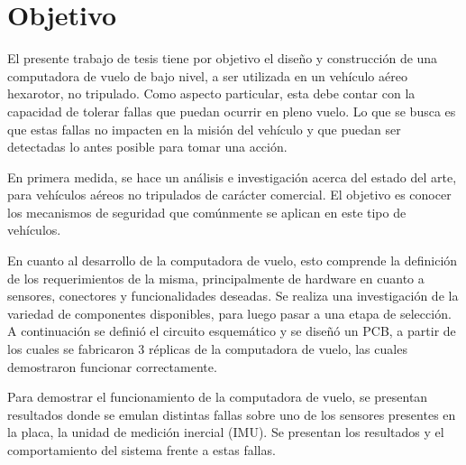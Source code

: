 \section{Objetivo}


El presente trabajo de tesis tiene por objetivo el diseño y construcción de una computadora de vuelo de bajo nivel, a ser utilizada en un vehículo aéreo hexarotor, no tripulado. Como aspecto particular, esta debe contar con la capacidad de tolerar fallas %
que puedan ocurrir en pleno vuelo. Lo que se busca es que estas fallas no impacten en la misión del vehículo y que puedan ser detectadas lo antes posible para tomar una acción.

En primera medida, se hace un análisis e investigación acerca del estado del arte, para vehículos aéreos no tripulados de carácter comercial. El objetivo es conocer los mecanismos de seguridad que comúnmente se aplican en este tipo de vehículos.%

En cuanto al desarrollo de la computadora de vuelo, esto comprende la definición de los requerimientos de la misma, principalmente de hardware en cuanto a sensores, conectores y funcionalidades deseadas. Se realiza una investigación de la variedad de componentes disponibles, para luego pasar a una etapa de selección. %
A continuación se definió el circuito esquemático y se diseñó un PCB, a partir de los cuales se fabricaron 3 réplicas de la computadora de vuelo, las cuales demostraron funcionar correctamente.



Para demostrar el funcionamiento de la computadora de vuelo, se presentan resultados donde se emulan distintas fallas sobre uno de los sensores presentes en la placa, la unidad de medición inercial (IMU). Se presentan los resultados y el comportamiento del sistema frente a estas fallas.